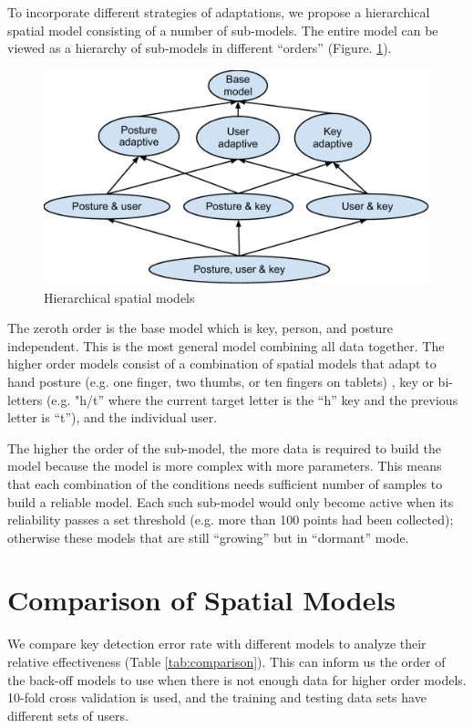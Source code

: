 \documentclass{sigchi}
\begin{document}
To incorporate different strategies of adaptations, we propose a hierarchical
spatial model consisting of a number of sub-models.
The entire model can be viewed as a hierarchy of sub-models in different
“orders” (Figure. \ref{fig:hierarchy}).

\begin{figure}[tb]
  \centering
  \includegraphics[width=1\columnwidth]{figures/hierarchical-spatial-model.pdf}
  \caption{Hierarchical spatial models}
  \label{fig:hierarchy}
\end{figure}

The zeroth order is the base model which is key, person, and posture
independent. This is the most general model combining all data together. The
higher order models consist of a combination of spatial models that adapt to hand 
posture (e.g. one finger, two thumbs, or ten fingers on tablets) , key or 
bi-letters (e.g. "h/t” where the current target letter is the “h” key and the 
previous letter is “t”), and the individual user. 

The higher the order of the sub-model, the more data is required to build the model because
the model is more complex with more parameters. This means that each combination of the 
conditions needs sufficient number of samples to build a reliable model. Each 
such sub-model would only become active when its reliability passes a set 
threshold (e.g. more than 100 points had been collected); otherwise these models
 that are still “growing” but in “dormant” mode.

\section{Comparison of Spatial Models}
We compare key detection error rate with different models to analyze their
relative effectiveness (Table \ref{tab:comparison}). This can inform us the order of the
back-off models to use when there is not enough data for higher order models.
10-fold cross validation is used, and the training and testing data sets have
different sets of users.
\end{document}
